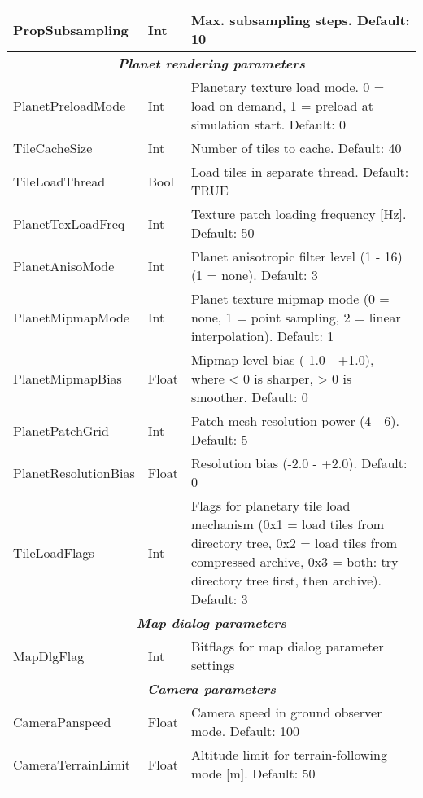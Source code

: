 \documentclass[Orbiter User Manual.tex]{subfiles}
\begin{document}
\begin{longtable}{ |p{}|p{}|p{}| }
	\hline\rule{0pt}{2ex}
	PropSubsampling & Int & Max. subsampling steps. Default: 10\\
	\hline
	\multicolumn{3}{|c|}{\rule{0pt}{2ex}\textbf{\textit{Planet rendering parameters}}}\\
	\hline\rule{0pt}{2ex}
	PlanetPreloadMode & Int & Planetary texture load mode. 0 = load on demand, 1 = preload at simulation start. Default: 0\\
	\hline\rule{0pt}{2ex}
	TileCacheSize & Int & Number of tiles to cache. Default: 40\\
	\hline\rule{0pt}{2ex}
	TileLoadThread & Bool & Load tiles in separate thread. Default: TRUE\\
	\hline\rule{0pt}{2ex}
	PlanetTexLoadFreq & Int & Texture patch loading frequency [Hz]. Default: 50\\
	\hline\rule{0pt}{2ex}
	PlanetAnisoMode & Int & Planet anisotropic filter level (1 - 16) (1 = none). Default: 3\\
	\hline\rule{0pt}{2ex}
	PlanetMipmapMode & Int & Planet texture mipmap mode (0 = none, 1 = point sampling, 2 = linear interpolation). Default: 1\\
	\hline\rule{0pt}{2ex}
	PlanetMipmapBias & Float & Mipmap level bias (-1.0 - +1.0), where < 0 is sharper, > 0 is smoother. Default: 0\\
	\hline\rule{0pt}{2ex}
	PlanetPatchGrid & Int & Patch mesh resolution power (4 - 6). Default: 5\\
	\hline\rule{0pt}{2ex}
	PlanetResolutionBias & Float & Resolution bias (-2.0 - +2.0). Default: 0\\
	\hline\rule{0pt}{2ex}
	TileLoadFlags & Int & Flags for planetary tile load mechanism (0x1 = load tiles from directory tree, 0x2 = load tiles from compressed archive, 0x3 = both: try directory tree first, then archive). Default: 3\\
	\hline
	\multicolumn{3}{|c|}{\rule{0pt}{2ex}\textbf{\textit{Map dialog parameters}}}\\
	\hline\rule{0pt}{2ex}
	MapDlgFlag & Int & Bitflags for map dialog parameter settings\\
	\hline
	\multicolumn{3}{|c|}{\rule{0pt}{2ex}\textbf{\textit{Camera parameters}}}\\
	\hline\rule{0pt}{2ex}
	CameraPanspeed & Float & Camera speed in ground observer mode. Default: 100\\
	\hline\rule{0pt}{2ex}
	CameraTerrainLimit & Float & Altitude limit for terrain-following mode [m]. Default: 50\\
	\hline\rule{0pt}{2ex}

\end{longtable}
\end{document}
